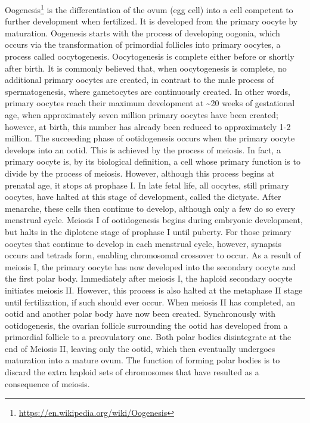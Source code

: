 \documentclass[]{book}
\let\rmarkdownfootnote\footnote%
\def\footnote{\protect\rmarkdownfootnote}
\renewcommand{\href}[2]{#2\footnote{\url{#1}}}
\theoremstyle{definition}
\theoremstyle{definition}
\theoremstyle{definition}
\theoremstyle{remark}
\begin{document}
\href{https://en.wikipedia.org/wiki/Oogenesis}{Oogenesis} is the
differentiation of the ovum (egg cell) into a cell competent to further
development when fertilized. It is developed from the primary oocyte by
maturation. Oogenesis starts with the process of developing oogonia,
which occurs via the transformation of primordial follicles into primary
oocytes, a process called oocytogenesis. Oocytogenesis is complete
either before or shortly after birth. It is commonly believed that, when
oocytogenesis is complete, no additional primary oocytes are created, in
contrast to the male process of spermatogenesis, where gametocytes are
continuously created. In other words, primary oocytes reach their
maximum development at \textasciitilde{}20 weeks of gestational age,
when approximately seven million primary oocytes have been created;
however, at birth, this number has already been reduced to approximately
1-2 million. The succeeding phase of ootidogenesis occurs when the
primary oocyte develops into an ootid. This is achieved by the process
of meiosis. In fact, a primary oocyte is, by its biological definition,
a cell whose primary function is to divide by the process of meiosis.
However, although this process begins at prenatal age, it stops at
prophase I. In late fetal life, all oocytes, still primary oocytes, have
halted at this stage of development, called the dictyate. After
menarche, these cells then continue to develop, although only a few do
so every menstrual cycle. Meiosis I of ootidogenesis begins during
embryonic development, but halts in the diplotene stage of prophase I
until puberty. For those primary oocytes that continue to develop in
each menstrual cycle, however, synapsis occurs and tetrads form,
enabling chromosomal crossover to occur. As a result of meiosis I, the
primary oocyte has now developed into the secondary oocyte and the first
polar body. Immediately after meiosis I, the haploid secondary oocyte
initiates meiosis II. However, this process is also halted at the
metaphase II stage until fertilization, if such should ever occur. When
meiosis II has completed, an ootid and another polar body have now been
created. Synchronously with ootidogenesis, the ovarian follicle
surrounding the ootid has developed from a primordial follicle to a
preovulatory one. Both polar bodies disintegrate at the end of Meiosis
II, leaving only the ootid, which then eventually undergoes maturation
into a mature ovum. The function of forming polar bodies is to discard
the extra haploid sets of chromosomes that have resulted as a
consequence of meiosis.
\end{document}

